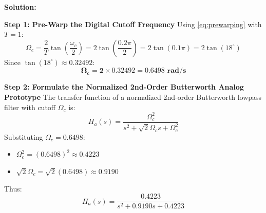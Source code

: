 \documentclass[11pt,a4paper]{article}
\begin{document}
\vspace{1mm}
\noindent\textbf{Solution:}

\noindent\textbf{Step 1: Pre-Warp the Digital Cutoff Frequency}
Using \eqref{eq:prewarping} with $T = 1$:
\begin{equation}
\Omega_c = \frac{2}{T}\tan\left(\frac{\omega_c}{2}\right) = 2 \tan\left(\frac{0.2\pi}{2}\right) = 2 \tan(0.1\pi) = 2 \tan(18^\circ)
\end{equation}
Since $\tan(18^\circ) \approx 0.32492$:
\begin{equation}
\mathbf{\Omega_c = 2 \times 0.32492 = 0.6498 \text{ rad/s}}
\end{equation}

\noindent\textbf{Step 2: Formulate the Normalized 2nd-Order Butterworth Analog Prototype}
The transfer function of a normalized 2nd-order Butterworth lowpass filter with cutoff $\Omega_c$ is:
\begin{equation}
H_a(s) = \frac{\Omega_c^2}{s^2 + \sqrt{2}\Omega_c s + \Omega_c^2}
\end{equation}
Substituting $\Omega_c = 0.6498$:
\begin{itemize}
    \item $\Omega_c^2 = (0.6498)^2 \approx \mathbf{0.4223}$
    \item $\sqrt{2}\Omega_c = \sqrt{2}(0.6498) \approx \mathbf{0.9190}$
\end{itemize}
Thus:
\begin{equation}
H_a(s) = \frac{0.4223}{s^2 + 0.9190 s + 0.4223}
\end{equation}
\end{document}
